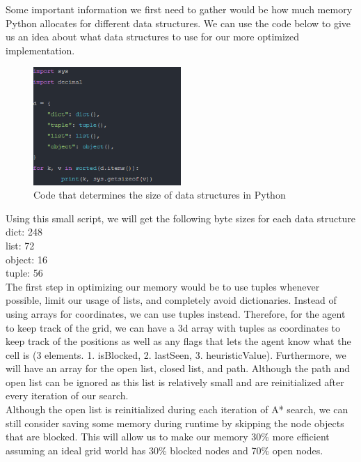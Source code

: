 \documentclass{article}
\begin{document}
Some important information we first need to gather would be how much memory Python allocates for different data structures. We can use the code below to give us an idea about what data structures to use for our more optimized implementation.

\begin{figure}[h!]
  \includegraphics[width=0.5\textwidth]{p6_0.png}
  \caption{Code that determines the size of data structures in Python }
\end{figure}

Using this small script, we will get the following byte sizes for each data structure\\
dict: 248\\
list: 72\\
object: 16\\
tuple: 56\\

The first step in optimizing our memory would be to use tuples whenever possible, limit our usage of lists, and completely avoid dictionaries. Instead of using arrays for coordinates, we can use tuples instead. Therefore, for the agent to keep track of the grid, we can have a 3d array with tuples as coordinates to keep track of the positions as well as any flags that lets the agent know what the cell is (3 elements. 1. isBlocked, 2. lastSeen, 3. heuristicValue). Furthermore, we will have an array for the open list, closed list, and path. Although the path and open list can be ignored as this list is relatively small and are reinitialized after every iteration of our search.\\

Although the open list is reinitialized during each iteration of A* search, we can still consider saving some memory during runtime by skipping the node objects that are blocked. This will allow us to make our memory 30\% more efficient assuming an ideal grid world has 30\% blocked nodes and 70\% open nodes.\\
\end{document}
